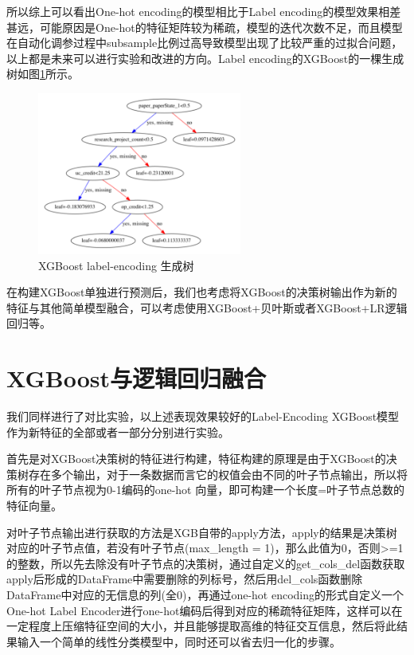 所以综上可以看出One-hot encoding的模型相比于Label encoding的模型效果相差甚远，可能原因是One-hot的特征矩阵较为稀疏，模型的迭代次数不足，而且模型在自动化调参过程中subsample比例过高导致模型出现了比较严重的过拟合问题，以上都是未来可以进行实验和改进的方向。Label encoding的XGBoost的一棵生成树如图\ref{XGBoost-label-encoding-decision-tree}所示。
\begin{figure}[htb]
  \vspace{13pt} %
  \centering
  \includegraphics[width=0.6\textwidth]{images/XGBoost-label-encoding-decision-tree.png}
  \caption{XGBoost label-encoding 生成树}\label{XGBoost-label-encoding-decision-tree} %
\end{figure}

在构建XGBoost单独进行预测后，我们也考虑将XGBoost的决策树输出作为新的特征与其他简单模型融合，可以考虑使用XGBoost+贝叶斯或者XGBoost+LR逻辑回归等。

\section{XGBoost与逻辑回归融合}

我们同样进行了对比实验，以上述表现效果较好的Label-Encoding XGBoost模型作为新特征的全部或者一部分分别进行实验。

首先是对XGBoost决策树的特征进行构建，特征构建的原理是由于XGBoost的决策树存在多个输出，对于一条数据而言它的权值会由不同的叶子节点输出，所以将所有的叶子节点视为0-1编码的one-hot 向量，即可构建一个长度=叶子节点总数的特征向量。

对叶子节点输出进行获取的方法是XGB自带的apply方法，apply的结果是决策树对应的叶子节点值，若没有叶子节点(max\_length = 1)，那么此值为0，否则>=1的整数，所以先去除没有叶子节点的决策树，通过自定义的get\_cols\_del函数获取apply后形成的DataFrame中需要删除的列标号，然后用del\_cols函数删除DataFrame中对应的无信息的列(全0)，再通过one-hot encoding的形式自定义一个One-hot Label Encoder进行one-hot编码后得到对应的稀疏特征矩阵，这样可以在一定程度上压缩特征空间的大小，并且能够提取高维的特征交互信息，然后将此结果输入一个简单的线性分类模型中，同时还可以省去归一化的步骤。

